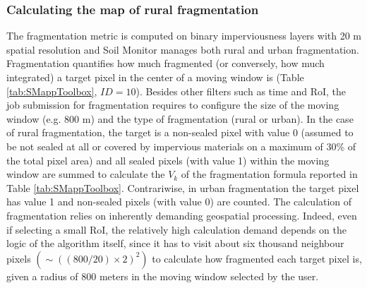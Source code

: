 \documentclass[APA,LATO1COL,doublespace]{WileyNJD-v2}
\begin{document}
\subsubsection{Calculating the map of rural fragmentation}
\label{sec:mmFragmentation}
The fragmentation metric is computed on binary imperviousness layers with 20 m spatial resolution and Soil Monitor manages both rural and urban fragmentation.
Fragmentation quantifies how much fragmented (or conversely, how much integrated) 
a target pixel in the center of a moving window is (Table \ref{tab:SMappToolbox}, $ID = 10$).
Besides other filters such as time and RoI, the job submission for fragmentation requires to configure the size of the moving window (e.g. 800 m) and the type of fragmentation (rural or urban).
In the case of rural fragmentation, the target is a non-sealed pixel with value 0 (assumed to be not sealed at all or covered by impervious materials on a maximum of 30\% of the total pixel area) and all sealed pixels (with value 1) within the moving window are summed to calculate the $V_k$ of the fragmentation formula reported in Table \ref{tab:SMappToolbox}.
Contrariwise, in urban fragmentation the target pixel has value 1 and non-sealed pixels (with value 0) are counted.
The calculation of fragmentation relies on inherently demanding geospatial processing.
Indeed, even if selecting a small RoI, the relatively high calculation demand depends on the logic of the algorithm itself, since it has to visit about six thousand neighbour pixels $\left( \sim \left( \left(800/20\right)\times2 \right)^2 \right)$ to calculate how fragmented each target pixel is, given a radius of 800 meters in the moving window selected by the user.
\end{document}
